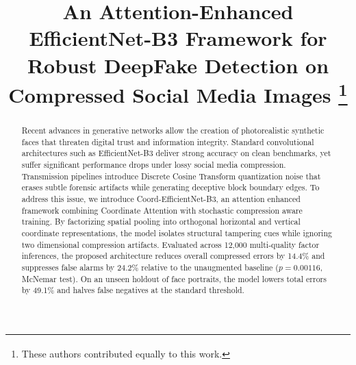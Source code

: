\documentclass[conference]{IEEEtran}
\begin{document}
\title{An Attention-Enhanced EfficientNet-B3 Framework for Robust DeepFake Detection on Compressed Social Media Images
\thanks{\textsuperscript{\dag}These authors contributed equally to this work.}
}

\author{
}

\maketitle

\begin{abstract}
Recent advances in generative networks allow the creation of photorealistic synthetic faces that threaten digital trust and information integrity. Standard convolutional architectures such as EfficientNet-B3 deliver strong accuracy on clean benchmarks, yet suffer significant performance drops under lossy social media compression. Transmission pipelines introduce Discrete Cosine Transform quantization noise that erases subtle forensic artifacts while generating deceptive block boundary edges. To address this issue, we introduce Coord-EfficientNet-B3, an attention enhanced framework combining Coordinate Attention with stochastic compression aware training. By factorizing spatial pooling into orthogonal horizontal and vertical coordinate representations, the model isolates structural tampering cues while ignoring two dimensional compression artifacts. Evaluated across 12,000 multi-quality factor inferences, the proposed architecture reduces overall compressed errors by 14.4\% and suppresses false alarms by 24.2\% relative to the unaugmented baseline ($p = 0.00116$, McNemar test). On an unseen holdout of face portraits, the model lowers total errors by 49.1\% and halves false negatives at the standard threshold.
\end{abstract}
\end{document}

